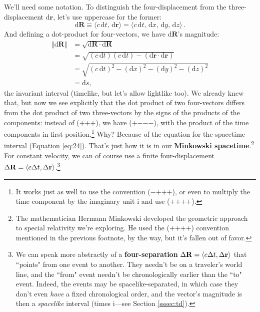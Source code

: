 \documentclass[12pt]{article}
\renewcommand{\vv}[1]{\mathbf{#1}}
\newcommand{\dd}[1]{\mathrm{d}#1}
\begin{document}
We'll need some notation. To distinguish the four-displacement from the three-displacement $\dd \vv r$, let's use uppercase for the former:
\begin{equation}\label{eq:30}
\boxed{\dd \vv R \equiv \langle c \, \dd t, \, \dd \vv r \rangle = \langle c\, \dd t, \, \dd x, \, \dd y, \, \dd z \rangle} \, .
\end{equation}
And defining a dot-product for four-vectors, we have $\dd \vv R$'s magnitude:
\begin{equation*}
\begin{split}
\Vert \dd \vv R \Vert &= \sqrt{\dd \vv R \cdot \dd \vv R}\\
&= \sqrt{(c \, \dd t)(c \, \dd t) - (\dd \vv r \cdot \dd \vv r)}\\
&= \sqrt{(c \, \dd t)^2 - (\dd x)^2 - (\dd y)^2 - (\dd z)^2}\\
&= \dd s,
\end{split}
\end{equation*}
the invariant interval (timelike, but let's allow lightlike too). We already knew that, but now we see explicitly that the dot product of two four-vectors differs from the dot product of two three-vectors by the signs of the products of the components: instead of ($+$$+$$+$), we have ($+$$-$$-$$-$), with the product of the time components in first position.\footnote{\label{fn:sc}It works just as well to use the convention ($-$$+$$+$$+$), or even to multiply the time component by the imaginary unit $\mathrm{i}$ and use ($+$$+$$+$$+$).} Why? Because of the equation for the spacetime interval (Equation \ref{eq:24}). That's just how it is in our \textbf{Minkowski spacetime}.\footnote{The mathematician Hermann Minkowski developed the geometric approach to special relativity we're exploring. He used the ($+$$+$$+$$+$) convention mentioned in the previous footnote, by the way, but it's fallen out of favor.} For constant velocity, we can of course use a finite four-displacement $\Delta \vv R = \langle c \mkern.5mu \Delta t, \Delta \vv r \rangle$.\footnote{\label{fn:sp}We can speak more abstractly of a \textbf{four-separation} $\Delta \vv R = \langle c \mkern.5mu \Delta t, \Delta \vv r \rangle$ that ``points" from one event to another. They needn't be on a traveler's world line, and the ``from" event needn't be chronologically earlier than the ``to" event. Indeed, the events may be spacelike-separated, in which case they don't even \emph{have} a fixed chronological order, and the vector's magnitude is then a \emph{spacelike} interval (times $\mathrm{i}$---see Section \ref{sssec:td}).}
\end{document}
